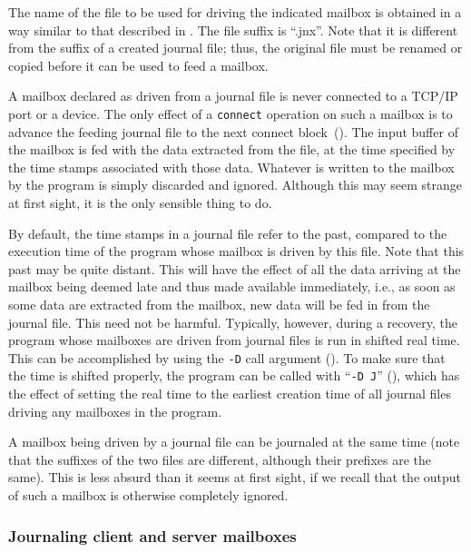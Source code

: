 The name of the file to be used for driving the indicated mailbox is
obtained in a way similar to that described in
.
The file suffix is ``{.jnx}''.
Note that it is different from the suffix of a created journal file; thus,
the original file must be renamed or copied before it can be used to
feed a mailbox.

A mailbox declared as driven from a journal file is never connected to
a TCP/IP port or a device.
The only effect of a {\tt connect} operation on such a mailbox is to
advance the feeding journal file to the next connect block~().
The input buffer of the mailbox is fed with the data extracted from the
file, at the time specified by the time stamps associated with those data.
Whatever is written to the mailbox by the program is simply discarded
and ignored.
Although this may seem strange at first sight, it is the only
sensible thing to do.

By default,
the time stamps in a journal file refer to the
past, compared to the execution time of the program whose
mailbox is driven by this file.
Note that this past may be quite distant.
This will have the effect of all the data arriving at the mailbox being
deemed late and thus made available immediately,
i.e., as soon as some data are extracted from the
mailbox, new data will be fed in from the journal file.
This need not be harmful.
Typically, however, during a recovery, the program whose mailboxes are driven
from journal files is run in shifted real time.
This can be accomplished by using the {\tt -D} call argument
().
To make sure that the time is shifted properly,
the program can be called with ``{\tt -D~J}'' (), which has
the effect of setting the real time to the earliest creation time of all
journal files driving any mailboxes in the program.

A mailbox being driven by a journal file can be journaled at the
same time (note that the
suffixes of the two files are different, although their prefixes are the
same).
This is less absurd than it seems at first sight, if we recall that the
output of such a mailbox is otherwise completely ignored.

\subsubsection{Journaling client and server mailboxes}
\label{rm_mb_ju_sm}

